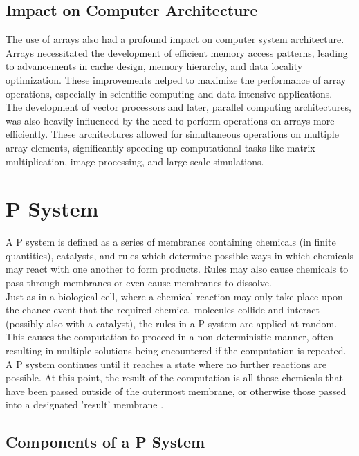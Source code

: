 \documentclass[12pt, oneside]{book}
\begin{document}
	\subsection{Impact on Computer Architecture}
The use of arrays also had a profound impact on computer system architecture. Arrays necessitated the development of efficient memory access patterns, leading to advancements in cache design, memory hierarchy, and data locality optimization. These improvements helped to maximize the performance of array operations, especially in scientific computing and data-intensive applications.\\The development of vector processors and later, parallel computing architectures, was also heavily influenced by the need to perform operations on arrays more efficiently. These architectures allowed for simultaneous operations on multiple array elements, significantly speeding up computational tasks like matrix multiplication, image processing, and large-scale simulations.

\section{P System}
A P system is defined as a series of membranes containing chemicals (in finite quantities), catalysts, and rules which determine possible ways in which chemicals may react with one another to form products. Rules may also cause chemicals to pass through membranes or even cause membranes to dissolve.\\Just as in a biological cell, where a chemical reaction may only take place upon the chance event that the required chemical molecules collide and interact (possibly also with a catalyst), the rules in a P system are applied at random. This causes the computation to proceed in a non-deterministic manner, often resulting in multiple solutions being encountered if the computation is repeated.\\A P system continues until it reaches a state where no further reactions are possible. At this point, the result of the computation is all those chemicals that have been passed outside of the outermost membrane, or otherwise those passed into a designated 'result' membrane \cite{PsystemResults}.

\subsection{Components of a P System}
\end{document}
